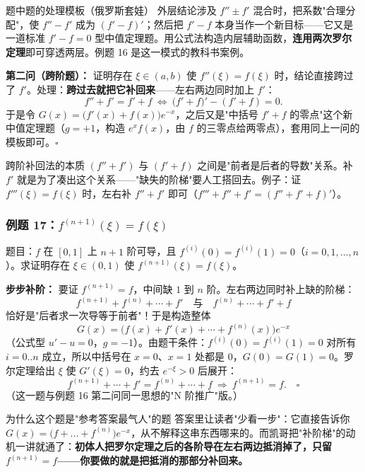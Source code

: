 \documentclass[a4paper]{article}
\begin{document}
\begin{importantbox}{题中题的处理模板（俄罗斯套娃）}
外层结论涉及 $f''\pm f'$ 混合时，把系数"合理分配"，使 $f''-f'$ 成为 $(f'-f)'$；然后把 $f'-f$ 本身当作一个新目标——它又是一道标准 $f'-f=0$ 型中值定理题。用公式法构造内层辅助函数，\textbf{连用两次罗尔定理}即可穿透两层。例题 16 是这一模式的教科书案例。
\end{importantbox}

\textbf{第二问（跨阶题）：} 证明存在 $\xi\in(a,b)$ 使 $f''(\xi)=f(\xi)$ 时，结论直接跨过了 $f'$。处理：\textbf{跨过去就把它补回来}——左右两边同时加上 $f'$：
\[
f''+f'=f'+f\ \Leftrightarrow\ \big(f'+f\big)'-(f'+f)=0 .
\]
于是令 $G(x)=\big(f'(x)+f(x)\big)e^{-x}$，之后又是"中括号 $f'+f$ 的零点"这个新中值定理题（$g=+1$，构造 $e^{x}f(x)$，由 $f$ 的三零点给两零点），套用同上一问的模板即可。$\square$

\begin{warningbox}{跨阶补回法的本质}
$(f''+f')$ 与 $(f'+f)$ 之间是"前者是后者的导数"关系。补 $f'$ 就是为了凑出这个关系——"缺失的阶梯"要人工搭回去。例子：证 $f'''(\xi)=f(\xi)$ 时，左右补 $f''+f'$ 即可（$f'''+f''+f'=(f''+f'+f)'$）。
\end{warningbox}

\subsubsection{例题 17：$f^{(n+1)}(\xi)=f(\xi)$}

题目：$f$ 在 $[0,1]$ 上 $n+1$ 阶可导，且 $f^{(i)}(0)=f^{(i)}(1)=0$（$i=0,1,\ldots,n$）。求证明存在 $\xi\in(0,1)$ 使 $f^{(n+1)}(\xi)=f(\xi)$。

\textbf{步步补阶：} 要证 $f^{(n+1)}=f$，中间缺 $1$ 到 $n$ 阶。左右两边同时补上缺的阶梯：
\[
f^{(n+1)}+f^{(n)}+\cdots+f'\quad\text{与}\quad f^{(n)}+\cdots+f'+f
\]
恰好是"后者求一次导等于前者"！于是构造整体
\[
G(x)=\big(f(x)+f'(x)+\cdots+f^{(n)}(x)\big)e^{-x}
\]
（公式型 $u'-u=0$，$g=-1$）。由题干条件：$f^{(i)}(0)=f^{(i)}(1)=0$ 对所有 $i=0..n$ 成立，所以中括号在 $x=0$、$x=1$ 处都是 0，$G(0)=G(1)=0$。罗尔定理给出 $\xi$ 使 $G'(\xi)=0$，约去 $e^{-\xi}>0$ 后展开：
\[
f^{(n+1)}+\cdots+f'=f^{(n)}+\cdots+f\ \Rightarrow\ f^{(n+1)}=f.\quad\square
\]
（这一题与例题 16 第二问同一思想的"N 阶推广"版。）

\begin{knowledgebox}{为什么这个题是"参考答案最气人"的题}
答案里让读者"少看一步"：它直接告诉你 $G(x)=\big(f+...+f^{(n)}\big)e^{-x}$，从不解释这串东西哪来的。而凯哥把"补阶梯"的动机一讲就通了：\textbf{初体人把罗尔定理之后的各阶导在左右两边抵消掉了，只留 $f^{(n+1)}=f$——你要做的就是把抵消的那部分补回来。}
\end{knowledgebox}
\end{document}
